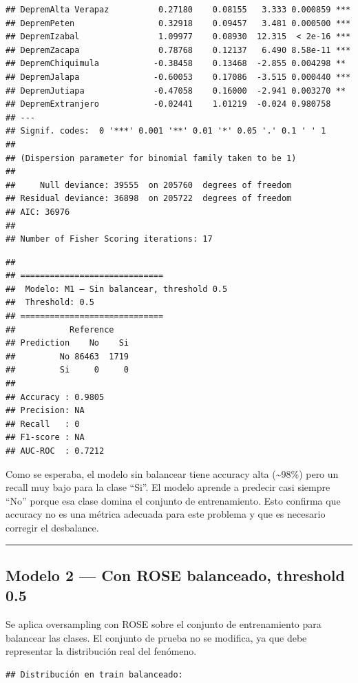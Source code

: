 \documentclass[
]{article}
\begin{document}
\begin{verbatim}
## DepremAlta Verapaz          0.27180    0.08155   3.333 0.000859 ***
## DepremPeten                 0.32918    0.09457   3.481 0.000500 ***
## DepremIzabal                1.09977    0.08930  12.315  < 2e-16 ***
## DepremZacapa                0.78768    0.12137   6.490 8.58e-11 ***
## DepremChiquimula           -0.38458    0.13468  -2.855 0.004298 ** 
## DepremJalapa               -0.60053    0.17086  -3.515 0.000440 ***
## DepremJutiapa              -0.47058    0.16000  -2.941 0.003270 ** 
## DepremExtranjero           -0.02441    1.01219  -0.024 0.980758    
## ---
## Signif. codes:  0 '***' 0.001 '**' 0.01 '*' 0.05 '.' 0.1 ' ' 1
## 
## (Dispersion parameter for binomial family taken to be 1)
## 
##     Null deviance: 39555  on 205760  degrees of freedom
## Residual deviance: 36898  on 205722  degrees of freedom
## AIC: 36976
## 
## Number of Fisher Scoring iterations: 17
\end{verbatim}

\begin{verbatim}
## 
## =============================
##  Modelo: M1 – Sin balancear, threshold 0.5 
##  Threshold: 0.5 
## =============================
##           Reference
## Prediction    No    Si
##         No 86463  1719
##         Si     0     0
## 
## Accuracy : 0.9805 
## Precision: NA 
## Recall   : 0 
## F1-score : NA 
## AUC-ROC  : 0.7212
\end{verbatim}

Como se esperaba, el modelo sin balancear tiene accuracy alta
(\textasciitilde98\%) pero un recall muy bajo para la clase ``Si''. El
modelo aprende a predecir casi siempre ``No'' porque esa clase domina el
conjunto de entrenamiento. Esto confirma que accuracy no es una métrica
adecuada para este problema y que es necesario corregir el desbalance.

\begin{center}\rule{0.5\linewidth}{0.5pt}\end{center}

\subsection{Modelo 2 --- Con ROSE balanceado, threshold
0.5}\label{modelo-2-con-rose-balanceado-threshold-0.5}

Se aplica oversampling con ROSE sobre el conjunto de entrenamiento para
balancear las clases. El conjunto de prueba no se modifica, ya que debe
representar la distribución real del fenómeno.

\begin{verbatim}
## Distribución en train balanceado:
\end{verbatim}
\end{document}
